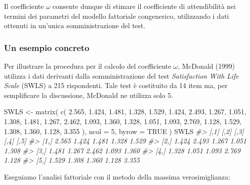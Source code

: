 \documentclass[
  11pt,
]{krantz}
\makeatletter
\newenvironment{Shaded}{\begin{snugshade}}{\end{snugshade}}
\newcommand{\AttributeTok}[1]{\textcolor[rgb]{0.61,0.61,0.61}{#1}}
\newcommand{\CommentTok}[1]{\textcolor[rgb]{0.37,0.37,0.37}{\textit{#1}}}
\newcommand{\ConstantTok}[1]{\textcolor[rgb]{0,0,0}{#1}}
\newcommand{\DecValTok}[1]{\textcolor[rgb]{0.06,0.06,0.06}{#1}}
\newcommand{\FloatTok}[1]{\textcolor[rgb]{0.06,0.06,0.06}{#1}}
\newcommand{\FunctionTok}[1]{\textcolor[rgb]{0,0,0}{#1}}
\newcommand{\NormalTok}[1]{#1}
\newcommand{\OtherTok}[1]{\textcolor[rgb]{0.37,0.37,0.37}{#1}}
\newenvironment{kframe}{%
\medskip{}
\setlength{\fboxsep}{.8em}
 \def\at@end@of@kframe{}%
 \ifinner\ifhmode%
  \def\at@end@of@kframe{\end{minipage}}%
  \begin{minipage}{\columnwidth}%
 \fi\fi%
 \def\FrameCommand##1{\hskip\@totalleftmargin \hskip-\fboxsep
 \colorbox{shadecolor}{##1}\hskip-\fboxsep
     \hskip-\linewidth \hskip-\@totalleftmargin \hskip\columnwidth}%
 \MakeFramed {\advance\hsize-\width
   \@totalleftmargin\z@ \linewidth\hsize
   \@setminipage}}%
 {\par\unskip\endMakeFramed%
 \at@end@of@kframe}
\renewenvironment{Shaded}{\begin{kframe}}{\end{kframe}}
\theoremstyle{definition}
\theoremstyle{definition}
\theoremstyle{definition}
\theoremstyle{definition}
\theoremstyle{remark}
\makeatother
\begin{document}
Il coefficiente \(\omega\) consente dunque di stimare il coefficiente di attendibilità nei termini dei parametri del modello fattoriale congenerico, utilizzando i dati ottenuti in un'unica somministrazione del test.

\hypertarget{un-esempio-concreto}{%
\subsubsection{Un esempio concreto}\label{un-esempio-concreto}}

Per illustrare la procedura per il calcolo del coefficiente \(\omega\), McDonald (1999) utilizza i dati derivanti dalla somministrazione del test \emph{Satisfaction With Life Scale} (SWLS) a 215 rispondenti. Tale test è costituito da 14 item ma, per semplificare la discussione, McDonald ne utilizza solo 5.

\begin{Shaded}
\begin{Highlighting}[]
\NormalTok{SWLS }\OtherTok{\textless{}{-}} \FunctionTok{matrix}\NormalTok{(}
  \FunctionTok{c}\NormalTok{(}
    \FloatTok{2.565}\NormalTok{, }\FloatTok{1.424}\NormalTok{, }\FloatTok{1.481}\NormalTok{, }\FloatTok{1.328}\NormalTok{, }\FloatTok{1.529}\NormalTok{,}
    \FloatTok{1.424}\NormalTok{, }\FloatTok{2.493}\NormalTok{, }\FloatTok{1.267}\NormalTok{, }\FloatTok{1.051}\NormalTok{, }\FloatTok{1.308}\NormalTok{,}
    \FloatTok{1.481}\NormalTok{, }\FloatTok{1.267}\NormalTok{, }\FloatTok{2.462}\NormalTok{, }\FloatTok{1.093}\NormalTok{, }\FloatTok{1.360}\NormalTok{,}
    \FloatTok{1.328}\NormalTok{, }\FloatTok{1.051}\NormalTok{, }\FloatTok{1.093}\NormalTok{, }\FloatTok{2.769}\NormalTok{, }\FloatTok{1.128}\NormalTok{,}
    \FloatTok{1.529}\NormalTok{, }\FloatTok{1.308}\NormalTok{, }\FloatTok{1.360}\NormalTok{, }\FloatTok{1.128}\NormalTok{, }\FloatTok{3.355}
\NormalTok{  ),}
  \AttributeTok{ncol =} \DecValTok{5}\NormalTok{, }\AttributeTok{byrow =} \ConstantTok{TRUE}
\NormalTok{)}
\NormalTok{SWLS}
\CommentTok{\#\textgreater{}       [,1]  [,2]  [,3]  [,4]  [,5]}
\CommentTok{\#\textgreater{} [1,] 2.565 1.424 1.481 1.328 1.529}
\CommentTok{\#\textgreater{} [2,] 1.424 2.493 1.267 1.051 1.308}
\CommentTok{\#\textgreater{} [3,] 1.481 1.267 2.462 1.093 1.360}
\CommentTok{\#\textgreater{} [4,] 1.328 1.051 1.093 2.769 1.128}
\CommentTok{\#\textgreater{} [5,] 1.529 1.308 1.360 1.128 3.355}
\end{Highlighting}
\end{Shaded}

Eseguiamo l'analisi fattoriale con il metodo della massima verosimiglianza:
\end{document}
